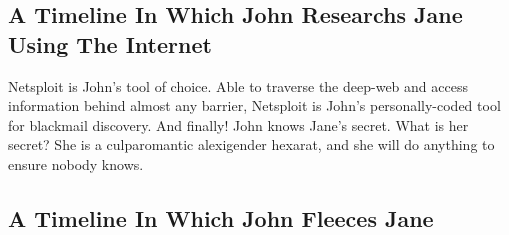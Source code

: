 \documentclass{article}
\begin{document}
\subsection{A Timeline In Which John Researchs Jane Using The Internet}


Netsploit is John's tool of choice. Able to traverse the deep{-}web and access information behind almost any barrier, Netsploit is John's personally{-}coded tool for blackmail discovery.
And finally!
John knows Jane's secret. What is her secret? She is a culparomantic alexigender hexarat, and she will do anything to ensure nobody knows.
\subsection{A Timeline In Which John Fleeces Jane}
\end{document}
